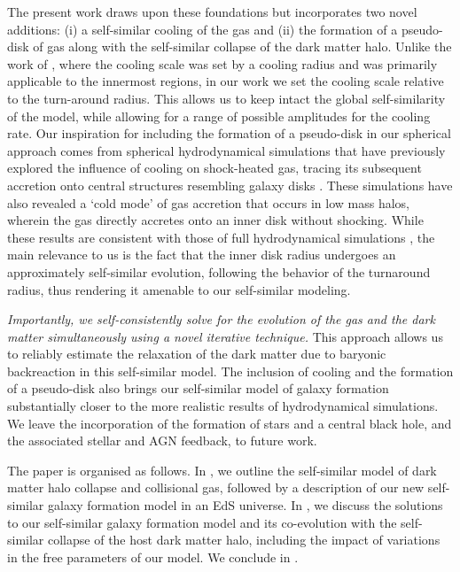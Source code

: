 The present work draws upon these foundations but incorporates two novel additions: (i) a self-similar cooling of the gas and (ii) the formation of a pseudo-disk of gas along with the self-similar collapse of the dark matter halo. Unlike the work of \cite{1989Bertschinger}, where the cooling scale was set by a cooling radius and was primarily applicable to the innermost regions, in our work we set the cooling scale relative to the turn-around radius. This allows us to keep intact the global self-similarity of the model, while allowing for a range of possible amplitudes for the cooling rate. Our inspiration for including the formation of a pseudo-disk in our spherical approach comes from spherical hydrodynamical simulations that have previously explored the influence of cooling on shock-heated gas, tracing its subsequent accretion onto central structures resembling galaxy disks \cite{2006Dekel&Birnboim}. These simulations have also revealed a `cold mode' of gas accretion that occurs in low mass halos, wherein the gas directly accretes onto an inner disk without shocking. While these results are consistent with those of full hydrodynamical simulations \cite{2005Keres_KWD},
the main relevance to us is the fact that the inner disk radius undergoes an approximately self-similar evolution, following the behavior of the turnaround radius, thus rendering it amenable to our self-similar modeling.

\emph{Importantly, we self-consistently solve for the evolution of the gas and the dark matter simultaneously using a novel iterative technique.} This approach allows us to reliably estimate the relaxation of the dark matter due to baryonic backreaction in this self-similar model. The inclusion of cooling and the formation of a pseudo-disk also brings our self-similar model of galaxy formation substantially closer to the more realistic results of hydrodynamical simulations. We leave the incorporation of the formation of stars and a central black hole, and the associated stellar and AGN feedback, to future work.

The paper is organised as follows. In , we outline the self-similar model of dark matter halo collapse and collisional gas, followed by a description of our new self-similar galaxy formation model in an EdS universe. In , we discuss the solutions to our self-similar galaxy formation model and its co-evolution with the self-similar collapse of the host dark matter halo, including the impact of variations in the free parameters of our model. We conclude in .












